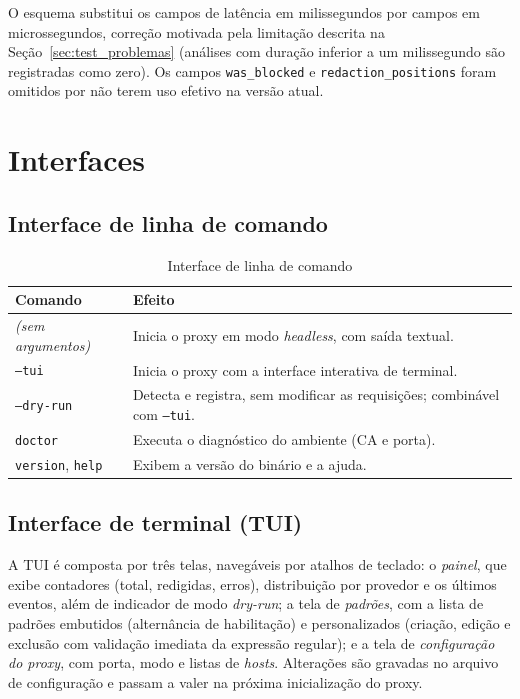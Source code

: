 O esquema substitui os campos de latência em milissegundos por campos em microssegundos, correção motivada pela limitação descrita na Seção~\ref{sec:test_problemas} (análises com duração inferior a um milissegundo são registradas como zero). Os campos \texttt{was\_blocked} e \texttt{redaction\_positions} foram omitidos por não terem uso efetivo na versão atual.

\section{Interfaces}

\subsection{Interface de linha de comando}

\begin{table}[htb]
\centering
\caption{Interface de linha de comando}\label{tab:cli}
\small
\begin{tabular}{|p{4.3cm}|p{9.6cm}|}
\hline
\textbf{Comando} & \textbf{Efeito} \\ \hline
\textit{(sem argumentos)} & Inicia o proxy em modo \textit{headless}, com saída textual. \\ \hline
\texttt{--tui} & Inicia o proxy com a interface interativa de terminal. \\ \hline
\texttt{--dry-run} & Detecta e registra, sem modificar as requisições; combinável com \texttt{--tui}. \\ \hline
\texttt{doctor} & Executa o diagnóstico do ambiente (CA e porta). \\ \hline
\texttt{version}, \texttt{help} & Exibem a versão do binário e a ajuda. \\ \hline
\end{tabular}
\end{table}

\subsection{Interface de terminal (TUI)}

A TUI é composta por três telas, navegáveis por atalhos de teclado: o \textit{painel}, que exibe contadores (total, redigidas, erros), distribuição por provedor e os últimos eventos, além de indicador de modo \textit{dry-run}; a tela de \textit{padrões}, com a lista de padrões embutidos (alternância de habilitação) e personalizados (criação, edição e exclusão com validação imediata da expressão regular); e a tela de \textit{configuração do proxy}, com porta, modo e listas de \textit{hosts}. Alterações são gravadas no arquivo de configuração e passam a valer na próxima inicialização do proxy.

